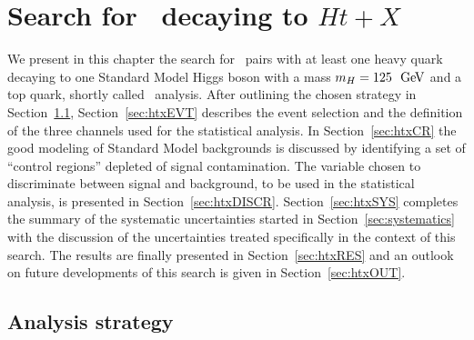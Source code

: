\clearpage{\pagestyle{empty}\cleardoublepage}

\chapter{Search for \TTbar\ decaying to $Ht+X$}\label{chap:htx}

We present in this chapter the search for \TTbar\ pairs with
at least one heavy quark decaying to one Standard Model Higgs boson 
with a mass $m_H= 125~\gev$ and a top
quark, shortly called \htx\ analysis.
After outlining the chosen strategy in Section~\ref{sec:htxMULT},
Section~\ref{sec:htxEVT} describes the event selection and the
definition of the three channels used for the statistical analysis.
In Section~\ref{sec:htxCR} the good modeling of Standard Model backgrounds
is discussed by identifying a set of ``control regions'' depleted of
signal contamination. The variable chosen to discriminate between
signal and background, to be used in the statistical analysis,
is presented in Section~\ref{sec:htxDISCR}.
Section~\ref{sec:htxSYS} completes the summary of the 
systematic uncertainties started in Section~\ref{sec:systematics}
with the discussion of the uncertainties treated specifically
in the context of this search.
The results are finally presented in Section~\ref{sec:htxRES}
and an outlook on future developments of this search is given
in Section~\ref{sec:htxOUT}.

\section{Analysis strategy}\label{sec:htxMULT}

